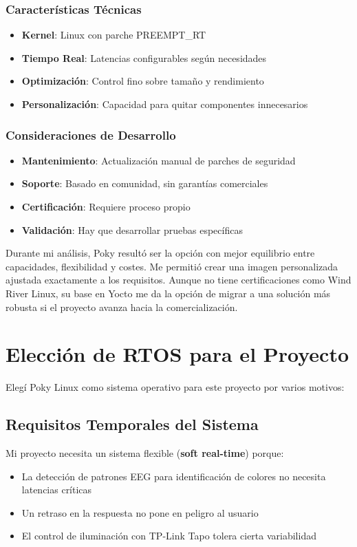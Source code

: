         \subsubsection{Características Técnicas}
            \begin{itemize}
                \item \textbf{Kernel}: Linux con parche PREEMPT\_RT
                \item \textbf{Tiempo Real}: Latencias configurables según necesidades
                \item \textbf{Optimización}: Control fino sobre tamaño y rendimiento
                \item \textbf{Personalización}: Capacidad para quitar componentes innecesarios
            \end{itemize}

        \subsubsection{Consideraciones de Desarrollo}
            \begin{itemize}
                \item \textbf{Mantenimiento}: Actualización manual de parches de seguridad
                \item \textbf{Soporte}: Basado en comunidad, sin garantías comerciales
                \item \textbf{Certificación}: Requiere proceso propio
                \item \textbf{Validación}: Hay que desarrollar pruebas específicas
            \end{itemize}

        Durante mi análisis, Poky resultó ser la opción con mejor equilibrio entre capacidades, flexibilidad y costes. Me permitió crear una imagen personalizada ajustada exactamente a los requisitos. Aunque no tiene certificaciones como Wind River Linux, su base en Yocto me da la opción de migrar a una solución más robusta si el proyecto avanza hacia la comercialización.

\newpage
\section{Elección de RTOS para el Proyecto}
    Elegí Poky Linux como sistema operativo para este proyecto por varios motivos:

    \subsection{Requisitos Temporales del Sistema}
        Mi proyecto necesita un sistema flexible (\textbf{soft real-time}) porque:
        \begin{itemize}
            \item La detección de patrones EEG para identificación de colores no necesita latencias críticas
            \item Un retraso en la respuesta no pone en peligro al usuario
            \item El control de iluminación con TP-Link Tapo tolera cierta variabilidad
        \end{itemize}

